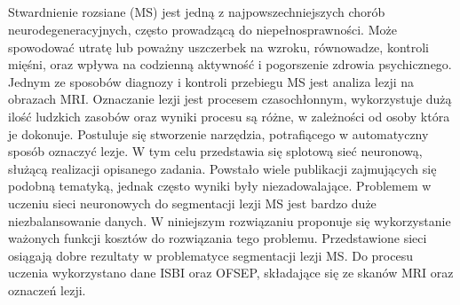 \begin{center}
\section*{\large\ThesisPL} 
\end{center}


Stwardnienie rozsiane (MS) jest jedną z najpowszechniejszych chorób neurodegeneracyjnych, często prowadzącą do niepełnosprawności. Może spowodować utratę lub poważny uszczerbek na wzroku, równowadze, kontroli mięśni, oraz wpływa na codzienną aktywność i pogorszenie zdrowia psychicznego. Jednym ze sposobów diagnozy i kontroli przebiegu MS jest analiza lezji na obrazach MRI. Oznaczanie lezji jest procesem czasochłonnym, wykorzystuje dużą ilość ludzkich zasobów oraz wyniki procesu są różne, w zależności od osoby która je dokonuje. Postuluje się stworzenie narzędzia, potrafiącego w automatyczny sposób oznaczyć lezje. W tym celu przedstawia się splotową sieć neuronową, służącą realizacji opisanego zadania. Powstało wiele publikacji zajmujących się podobną tematyką, jednak często wyniki były niezadowalające. Problemem w uczeniu sieci neuronowych do segmentacji lezji MS jest bardzo duże niezbalansowanie danych. W niniejszym rozwiązaniu proponuje się wykorzystanie ważonych funkcji kosztów do rozwiązania tego problemu. Przedstawione sieci osiągają dobre rezultaty w problematyce segmentacji lezji MS. Do procesu uczenia wykorzystano dane ISBI oraz OFSEP, składające się ze skanów MRI oraz oznaczeń lezji.\\[7ex]